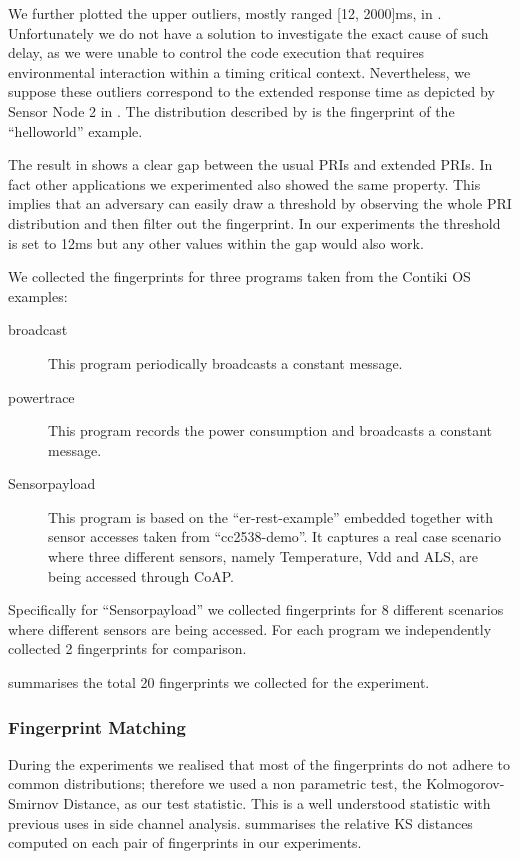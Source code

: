 \documentclass{article}
\begin{document}
We further plotted the upper outliers, mostly ranged [12, 2000]ms, in . Unfortunately we do not have a solution to investigate the exact cause of such delay, as we were unable to control the code execution that requires environmental interaction within a timing critical context. Nevertheless, we suppose these outliers correspond to the extended response time as depicted by Sensor Node 2 in . The distribution described by  is the fingerprint of the ``helloworld'' example.

The result in  shows a clear gap between the usual PRIs and extended PRIs. In fact other applications we experimented also showed the same property. This implies that an adversary can easily draw a threshold by observing the whole PRI distribution and then filter out the fingerprint. In our experiments the threshold is set to 12ms but any other values within the gap would also work. 

We collected the fingerprints for three programs taken from the Contiki OS examples:
\begin{description}
	\item[broadcast] This program periodically broadcasts a constant message.
	 
	\item[powertrace] This program records the power consumption and broadcasts a constant message.
	
	\item[Sensorpayload] This program is based on the ``er-rest-example'' embedded together with sensor accesses taken from ``cc2538-demo''. It captures a real case scenario where three different sensors, namely Temperature, Vdd and ALS, are being accessed through CoAP.
\end{description}

Specifically for ``Sensorpayload'' we collected fingerprints for 8 different scenarios where different sensors are being accessed. For each program we independently collected 2 fingerprints for comparison.

 summarises the total 20 fingerprints we collected for the experiment.

\subsubsection{Fingerprint Matching}

During the experiments we realised that most of the fingerprints do not adhere to common distributions; therefore we used a non parametric test, the Kolmogorov-Smirnov Distance\cite{KsTest}, as our test statistic. This is a well understood statistic with previous uses in side channel analysis\cite{KsDistanceDistinguisher}.  summarises the relative KS distances computed on each pair of fingerprints in our experiments.
\end{document}
